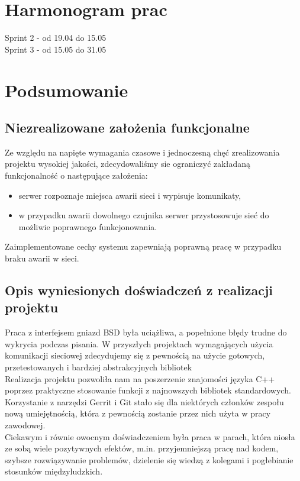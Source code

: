 \documentclass[a4paper,11pt]{article}
\begin{document}
\section{Harmonogram prac}
Sprint 2 - od 19.04 do 15.05 \\
Sprint 3 - od 15.05 do 31.05 \\

\section{Podsumowanie}
\subsection{Niezrealizowane założenia funkcjonalne}
Ze względu na napięte wymagania czasowe i jednoczesną chęć zrealizowania projektu wysokiej jakości, zdecydowaliśmy sie ograniczyć zakładaną funkcjonalność o następujące założenia: 
\begin{itemize}
    \item serwer rozpoznaje miejsca awarii sieci i wypisuje komunikaty,
    \item w przypadku awarii dowolnego czujnika serwer przystosowuje sieć do możliwie poprawnego funkcjonowania.
\end{itemize}
Zaimplementowane cechy systemu zapewniają poprawną pracę w przypadku braku awarii w sieci.

\subsection{Opis wyniesionych doświadczeń z realizacji projektu}
Praca z interfejsem gniazd BSD była uciążliwa, a popełnione błędy trudne do wykrycia podczas pisania. W przyszłych projektach wymagających użycia komunikacji sieciowej zdecydujemy się z pewnością na użycie gotowych, przetestowanych i bardziej abstrakcyjnych bibliotek \\
Realizacja projektu pozwoliła nam na poszerzenie znajomości języka C++ poprzez praktyczne stosowanie funkcji z najnowszych bibliotek standardowych. Korzystanie z narzędzi Gerrit i Git stało się dla niektórych członków zespołu nową umiejętnością, która z pewnością zostanie przez nich użyta w pracy zawodowej.\\
Ciekawym i równie owocnym doświadczeniem była praca w parach, która niosła ze sobą wiele pozytywnych efektów, m.in. przyjemniejszą pracę nad kodem, szybsze rozwiązywanie problemów, dzielenie się wiedzą z kolegami i pogłebianie stosunków międzyludzkich.
\end{document}
